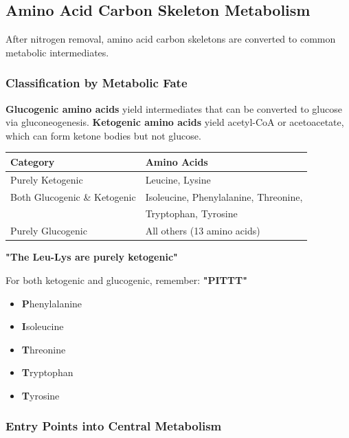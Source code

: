 \subsection{Amino Acid Carbon Skeleton Metabolism}

After nitrogen removal, amino acid carbon skeletons are converted to common metabolic intermediates.

\subsubsection{Classification by Metabolic Fate}

\begin{definition}
\textbf{Glucogenic amino acids} yield intermediates that can be converted to glucose via gluconeogenesis. \textbf{Ketogenic amino acids} yield acetyl-CoA or acetoacetate, which can form ketone bodies but not glucose.
\end{definition}

\begin{center}
\begin{tabular}{ll}
\toprule
\textbf{Category} & \textbf{Amino Acids} \\
\midrule
Purely Ketogenic & Leucine, Lysine \\
Both Glucogenic \& Ketogenic & Isoleucine, Phenylalanine, Threonine, \\
 & Tryptophan, Tyrosine \\
Purely Glucogenic & All others (13 amino acids) \\
\bottomrule
\end{tabular}
\end{center}

\begin{tcolorbox}[colback=blue!5, colframe=blue!70!black, title=\textbf{Mnemonic for Ketogenic Amino Acids}]
\textbf{"The Leu-Lys are purely ketogenic"}

For both ketogenic and glucogenic, remember: \textbf{"PITTT"}
\begin{itemize}
    \item \textbf{P}henylalanine
    \item \textbf{I}soleucine
    \item \textbf{T}hreonine
    \item \textbf{T}ryptophan
    \item \textbf{T}yrosine
\end{itemize}
\end{tcolorbox}

\subsubsection{Entry Points into Central Metabolism}

